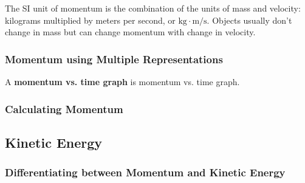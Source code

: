\documentclass[dvipsnames]{article}
\begin{document}
The SI unit of momentum is the combination of the units of mass and velocity: kilograms multiplied by meters per second, or $\mathrm{kg\cdot m/s}$. Objects usually don't change in mass but can change momentum with change in velocity. 

\subsubsection{Momentum using Multiple Representations}

A \textbf{\gls{momentum vs. time graph}} is \glsdesc{momentum vs. time graph}.

\begin{center}
\end{center}


\subsubsection{Calculating Momentum}

\subsection{Kinetic Energy}

\subsubsection{Differentiating between Momentum and Kinetic Energy}


\end{document}
